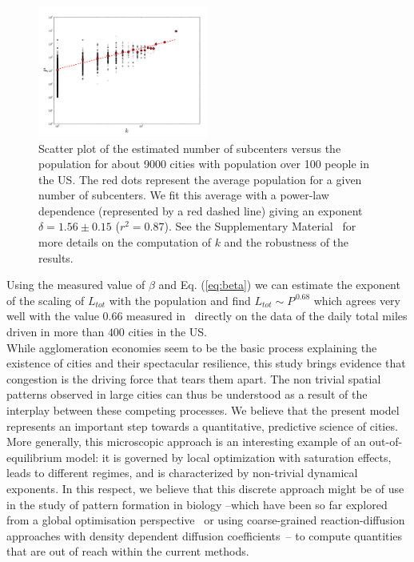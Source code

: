 \begin{figure}
\includegraphics[width=0.5\textwidth]{gfx/chapter-monocentric/5.pdf}
\caption{Scatter plot of the estimated number of subcenters versus the
  population for about 9000 cities with population over 100 people in
  the US. The red dots represent the average population for a given
  number of subcenters. We fit this average with a power-law
  dependence (represented by a red dashed line) giving an exponent
  $\delta=1.56\pm 0.15$ ($r^2=0.87$). See the Supplementary Material~\cite{SM} for more details on the computation of $k$ and the robustness of the results. \label{fig:data}}
\end{figure}

Using the measured value of $\beta$ and Eq. (\ref{eq:beta}) we can estimate the exponent of
the scaling of $L_{tot}$ with the population and find $L_{tot} \sim
P^{\,0.68}$ which agrees very well with the value $0.66$ measured
in~\cite{Samaniego:2008} directly on the data of the daily total miles
driven in more than $400$ cities in the US.\\

While agglomeration economies seem to be the basic process explaining
the existence of cities and their spectacular resilience, this study
brings evidence that congestion is the driving force that tears them
apart. The non trivial spatial patterns observed in large cities can
thus be understood as a result of the interplay between these
competing processes. We believe that the present model represents an
important step towards a quantitative, predictive science of
cities. More generally, this microscopic approach is an interesting
example of an out-of-equilibrium model: it is governed by local
optimization with saturation effects, leads to different regimes, and
is characterized by non-trivial dynamical exponents. In this respect,
we believe that this discrete approach might be of use in the study of
pattern formation in biology --which have been so far explored from a
global optimisation perspective~\cite{Ashton:2005} or using
coarse-grained reaction-diffusion approaches with density dependent
diffusion coefficients~\cite{Cates:2012}-- to compute quantities that
are out of reach within the current methods.

